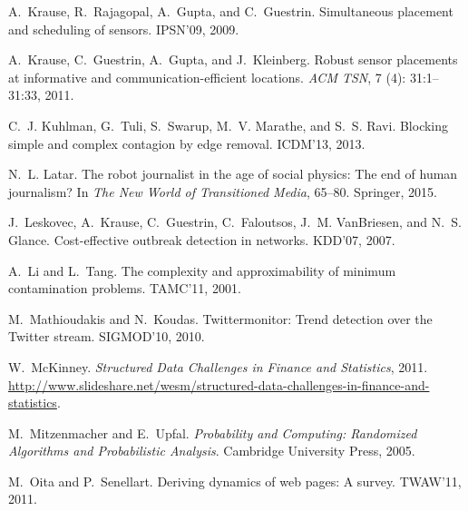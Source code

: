 \begin{thebibliography}{41}
A.~Krause, R.~Rajagopal, A.~Gupta, and C.~Guestrin.
\newblock Simultaneous placement and scheduling of sensors.
\newblock IPSN'09, 2009.

A.~Krause, C.~Guestrin, A.~Gupta, and J.~Kleinberg.
\newblock Robust sensor placements at informative and communication-efficient
  locations.
\newblock \emph{ACM TSN}, 7 (4): 31:1--31:33, 2011.

C.~J. Kuhlman, G.~Tuli, S.~Swarup, M.~V. Marathe, and S.~S. Ravi.
\newblock Blocking simple and complex contagion by edge removal.
\newblock ICDM'13, 2013.

N.~L. Latar.
\newblock The robot journalist in the age of social physics: The end of human
  journalism?
\newblock In \emph{The New World of Transitioned Media}, 65--80.
  Springer, 2015.

J.~Leskovec, A.~Krause, C.~Guestrin, C.~Faloutsos, J.~M. VanBriesen, and N.~S.
  Glance.
\newblock Cost-effective outbreak detection in networks.
\newblock KDD'07, 2007.

A.~Li and L.~Tang.
\newblock The complexity and approximability of minimum contamination problems.
\newblock TAMC'11, 2001.

M.~Mathioudakis and N.~Koudas.
\newblock Twittermonitor: Trend detection over the {T}witter stream.
\newblock SIGMOD'10, 2010.

W.~McKinney.
\newblock \emph{Structured Data Challenges in Finance and Statistics}, 2011.
\newblock
  \url{http://www.slideshare.net/wesm/structured-data-challenges-in-finance-and-statistics}.

M.~Mitzenmacher and E.~Upfal.
\newblock \emph{Probability and Computing: Randomized Algorithms and
  Probabilistic Analysis}.
\newblock Cambridge University Press, 2005.

M.~Oita and P.~Senellart.
\newblock Deriving dynamics of web pages: A survey.
\newblock TWAW'11, 2011.


\end{thebibliography}
